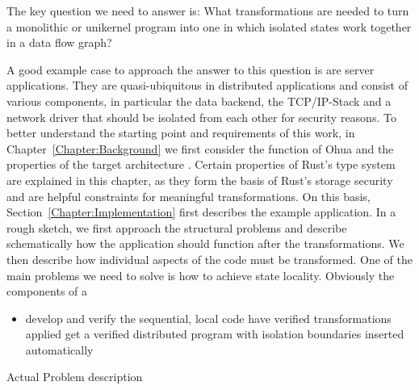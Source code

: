 The key question we need to answer is: What transformations are needed to turn a monolithic or unikernel program into one in which isolated states work together in a data flow graph? 

A good example case to approach the answer to this question is are server applications. They are quasi-ubiquitous in distributed applications and consist of various components, in particular the data backend, the TCP/IP-Stack and a network driver that should be isolated from each other for security reasons. To better understand the starting point and requirements of this work, in Chapter~\ref{Chapter:Background} we first consider the function of Ohua and the properties of the target architecture \md. Certain properties of Rust's type system are explained in this chapter, as they form the basis of Rust's storage security and are helpful constraints for meaningful transformations. On this basis, Section~\ref{Chapter:Implementation} first describes the example application. In a rough sketch, we first approach the structural problems and describe schematically how the application should function after the transformations. We then describe how individual aspects of the code must be transformed.
One of the main problems we need to solve is how to achieve state locality. Obviously the components of a 

\begin{itemize}
    \item develop and verify the sequential, local code \means have verified transformations applied \means get a verified distributed program with isolation boundaries inserted automatically
\end{itemize}

Actual Problem description

